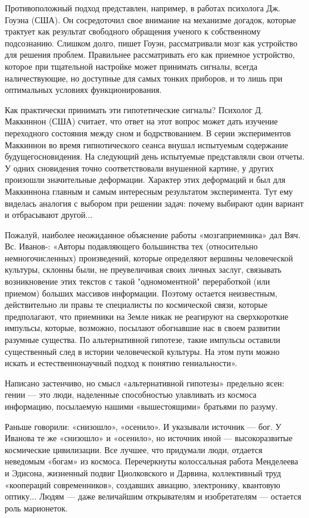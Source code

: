 Противоположный подход представлен, например,  в работах психолога Дж.
Гоуэна  (США). Он  сосредоточил  свое внимание  на механизме  догадок,
которые  трактует   как  результат  свободного  обращения   ученого  к
собственному  подсознанию. Слишком  долго, пишет  Гоуэн, рассматривали
мозг как устройство для  решения проблем. Правильнее рассматривать его
как  приемное  устройство,  которое  при  тщательной  настройке  может
принимать  сигналы,  всегда  наличествующие, но  доступные  для  самых
тонких приборов, и то лишь при оптимальных условиях функционирования.

Как  практически принимать  эти  гипотетические  сигналы? Психолог  Д.
Маккиннон  (США)  считает,  что  ответ   на  этот  вопрос  может  дать
изучение  переходного   состояния  между  сном  и   бодрствованием.  В
серии экспериментов  Маккиннон во  время гипнотического  сеанса внушал
испытуемым содержание будущегосновидения. На следующий день испытуемые
представляли  свои отчеты.  У одних  сновидения точно  соответствовали
внушенной  картине,   у  других  произошли   значительные  деформации.
Характер  этих  деформаций  и  был  для  Маккиннона  главным  и  самым
интересным  результатом  эксперимента.  Тут ему  виделась  аналогия  с
выбором при решении задач: почему  выбирают один вариант и отбрасывают
другой...

Пожалуй,  наиболее  неожиданное   объяснение  работы  «мозгаприемника»
дал   Вяч.  Вс.   Иванов-:   «Авторы   подавляющего  большинства   тех
(относительно   немногочисленных)  произведений,   которые  определяют
вершины   человеческой  культуры,   склонны  были,   не  преувеличивая
своих   личных  заслуг,   связывать  возникновение   этих  текстов   с
такой  "одномоментной"  переработкой  (или приемом)  больших  массивов
информации. Поэтому  остается неизвестным,  действительно ли  правы те
специалисты по космической связи,  которые предполагают, что приемники
на  Земле  никак  не  реагируют на  сверхкороткие  импульсы,  которые,
возможно, посылают обогнавшие нас  в своем развитии разумные существа.
По  альтернативной  гипотезе,  такие  импульсы  оставили  существенный
след  в истории  человеческой культуры.  На этом  пути можно  искать и
естественнонаучный подход к понятию гениальности».

Написано  застенчиво,  но  смысл «альтернативной  гипотезы»  предельно
ясен: гении — это люди,  наделенные способностью улавливать из космоса
информацию, посылаемую нашими «вышестоящими» братьями по разуму.

Раньше  говорили:  «снизошло»,  «осенило».   И  указывали  источник  —
бог.  У Иванова  те  же «снизошло»  и «осенило»,  но  источник иной  —
высокоразвитые  космические  цивилизации.  Все лучшее,  что  придумали
люди, отдается неведомым «богам» из космоса. Перечеркнуты колоссальная
работа Менделеева и Эдисона,  жизненный подвиг Циолковского и Дарвина,
коллективный  труд  «коопераций   современников»,  создавших  авиацию,
электронику, квантовую оптику... Людям  — даже величайшим открывателям
и изобретателям — остается роль марионеток.


